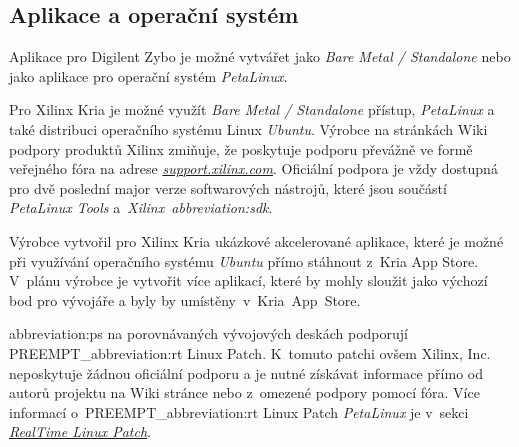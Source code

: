 \documentclass[a4paper, twoside, 11pt]{article}
\begin{document}
			\newpage
			\subsection{Aplikace a operační systém}\label{subsec:aplikace-a-operacni-system}
				Aplikace pro Digilent Zybo je možné vytvářet jako \textit{Bare Metal / Standalone} nebo jako aplikace pro operační systém \textit{PetaLinux}.\par
				Pro Xilinx Kria je možné využít \textit{Bare Metal / Standalone} přístup, \textit{PetaLinux} a také distribuci operačního systému Linux \textit{Ubuntu}. Výrobce na stránkách Wiki podpory produktů Xilinx zmiňuje, že poskytuje podporu převážně ve formě veřejného fóra na adrese \href{https://support.xilinx.com}{\textcolor{ctublue}{\textit{support.xilinx.com}}}. Oficiální podpora je vždy dostupná pro dvě poslední major verze softwarových nástrojů, které jsou součástí \textit{PetaLinux Tools} a~\textit{Xilinx~\gls{abbreviation:sdk}}. \cite{xilinx-wiki-atlassian-embedded-sw-support}\par
				Výrobce vytvořil pro Xilinx Kria ukázkové akcelerované aplikace, které je možné při využívání operačního systému \textit{Ubuntu} přímo stáhnout z~Kria App Store. V~plánu výrobce je vytvořit více aplikací, které by mohly sloužit jako výchozí bod pro vývojáře a byly by umístěny~v~Kria~App~Store. \cite{xilinx-appstore-for-kria-soms}\par
				\gls{abbreviation:ps} na porovnávaných vývojových deskách podporují PREEMPT\_\gls{abbreviation:rt} Linux Patch. K~tomuto patchi ovšem Xilinx, Inc. neposkytuje žádnou oficiální podporu a je nutné získávat informace přímo od autorů projektu na Wiki stránce \cite{wiki-linux-foundation-real-time-linux} nebo z~omezené podpory pomocí fóra. Více informací o~PREEMPT\_\gls{abbreviation:rt} Linux Patch \textit{PetaLinux} je v~sekci \hyperref[subsec:real-time-linux-patch]{\textit{RealTime Linux Patch}}.
\end{document}
